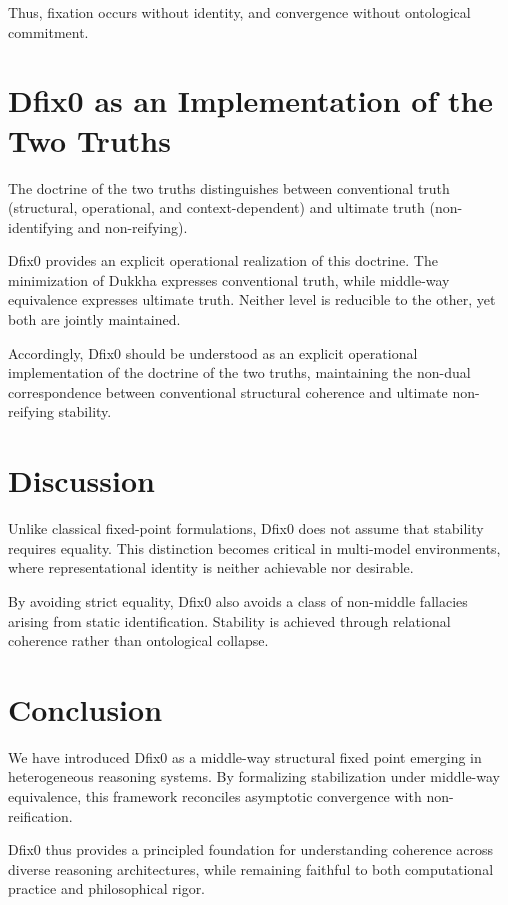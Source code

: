 \documentclass[11pt]{article}
\theoremstyle{definition}
\begin{document}
Thus, fixation occurs without identity, and convergence without
ontological commitment.

\section{Dfix0 as an Implementation of the Two Truths}

The doctrine of the two truths distinguishes between conventional truth
(structural, operational, and context-dependent)
and ultimate truth (non-identifying and non-reifying).

Dfix0 provides an explicit operational realization of this doctrine.
The minimization of Dukkha expresses conventional truth,
while middle-way equivalence expresses ultimate truth.
Neither level is reducible to the other, yet both are jointly maintained.

Accordingly, Dfix0 should be understood as an explicit operational
implementation of the doctrine of the two truths, maintaining the
non-dual correspondence between conventional structural coherence
and ultimate non-reifying stability.

\section{Discussion}

Unlike classical fixed-point formulations, Dfix0 does not assume that
stability requires equality.
This distinction becomes critical in multi-model environments,
where representational identity is neither achievable nor desirable.

By avoiding strict equality, Dfix0 also avoids a class of non-middle
fallacies arising from static identification.
Stability is achieved through relational coherence rather than
ontological collapse.

\section{Conclusion}

We have introduced Dfix0 as a middle-way structural fixed point
emerging in heterogeneous reasoning systems.
By formalizing stabilization under middle-way equivalence,
this framework reconciles asymptotic convergence with non-reification.

Dfix0 thus provides a principled foundation for understanding coherence
across diverse reasoning architectures, while remaining faithful to
both computational practice and philosophical rigor.
\end{document}
